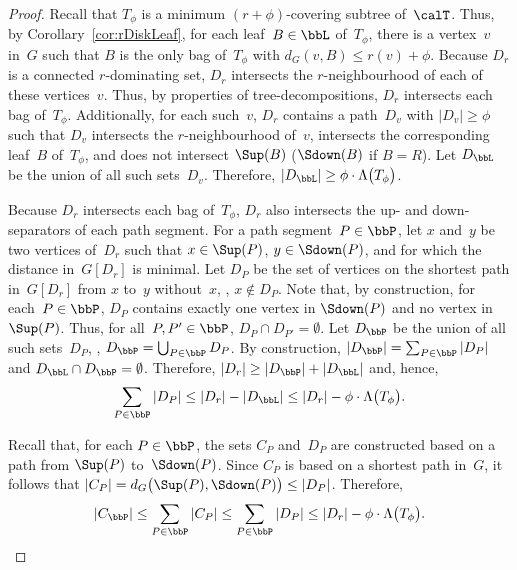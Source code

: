 \begin{proof}
Recall that $T_\phi$ is a minimum $(r + \phi)$-covering subtree of~$\calT$.
Thus, by Corollary~\ref{cor:rDiskLeaf}, for each leaf~$B \in \bbL$ of~$T_\phi$, there is a vertex~$v$ in~$G$ such that $B$ is the only bag of~$T_\phi$ with $d_G(v, B) \leq r(v) + \phi$.
Because $D_r$ is a connected $r$-dominating set, $D_r$ intersects the $r$-neighbourhood of each of these vertices~$v$.
Thus, by properties of tree-decompositions, $D_r$ intersects each bag of~$T_\phi$.
Additionally, for each such~$v$, $D_r$ contains a path~$D_v$ with $|D_v| \geq \phi$ such that $D_v$ intersects the $r$-neighbourhood of~$v$, intersects the corresponding leaf~$B$ of~$T_\phi$, and does not intersect $\Sup(B)$ ($\Sdown(B)$ if $B = R$).
Let $D_\bbL$ be the union of all such sets~$D_v$.
Therefore, $|D_\bbL| \geq \phi \cdot \Lambda \big( T_\phi \big)$.

Because $D_r$ intersects each bag of~$T_\phi$, $D_r$ also intersects the up- and down-separators of each path segment.
For a path segment~$P \in \bbP$, let $x$ and~$y$ be two vertices of~$D_r$ such that $x \in \Sup(P)$, $y \in \Sdown(P)$, and for which the distance in~$G[D_r]$ is minimal.
Let $D_P$ be the set of vertices on the shortest path in~$G[D_r]$ from $x$ to~$y$ without~$x$, \ie, $x \notin D_P$.
Note that, by construction, for each~$P \in \bbP$, $D_P$ contains exactly one vertex in $\Sdown(P)$ and no vertex in~$\Sup(P)$.
Thus, for all~$P, P' \in \bbP$, $D_P \cap D_{P'} = \emptyset$.
Let $D_\bbP$ be the union of all such sets~$D_P$, \ie, $D_\bbP = \bigcup_{P \in \bbP} D_P$.
By construction, $|D_\bbP| = \sum_{P \in \bbP} |D_P|$ and $D_\bbL \cap D_\bbP = \emptyset$.
Therefore, $|D_r| \geq |D_\bbP| + |D_\bbL|$ and, hence,
\[
    \sum_{P \in \bbP} |D_P| \leq |D_r| - |D_\bbL| \leq |D_r| - \phi \cdot \Lambda \big( T_\phi \big).
\]

Recall that, for each $P \in \bbP$, the sets $C_P$ and~$D_P$ are constructed based on a path from $\Sup(P)$ to~$\Sdown(P)$.
Since $C_P$ is based on a shortest path in~$G$, it follows that $|C_P| = d_G \big( \Sup(P), \Sdown(P) \big) \leq |D_P|$.
Therefore,
\[
    |C_\bbP| \leq \sum_{P \in \bbP} |C_P| \leq \sum_{P \in \bbP} |D_P| \leq |D_r| - \phi \cdot \Lambda \big( T_\phi \big).
    \qedhere
\]
\end{proof}


